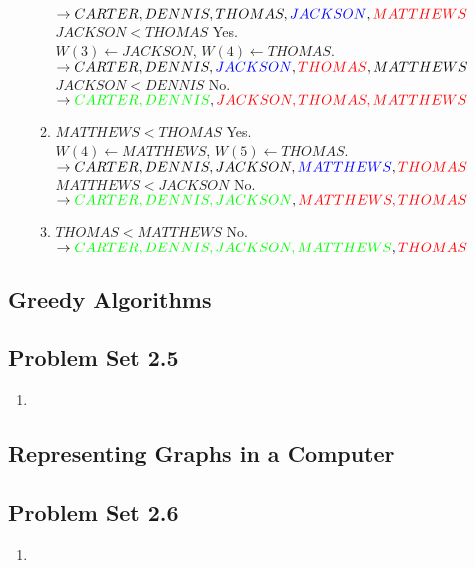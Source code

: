 \begin{enumerate}
\begin{enumerate}
			$\to CARTER,DENNIS,THOMAS,\textcolor{blue}{JACKSON},\textcolor{red}{MATTHEWS}$\\
			$JACKSON < THOMAS$ Yes.\\
			$W(3) \leftarrow JACKSON$, $W(4) \leftarrow THOMAS$.\\
			$\to CARTER,DENNIS,\textcolor{blue}{JACKSON},\textcolor{red}{THOMAS},MATTHEWS$\\
			$JACKSON < DENNIS$ No.\\
			$\to \textcolor{green}{CARTER, DENNIS}, \textcolor{red}{JACKSON, THOMAS, MATTHEWS}$
		\item $MATTHEWS < THOMAS$ Yes.\\
			$W(4) \leftarrow MATTHEWS$, $W(5) \leftarrow THOMAS$.\\
			$\to CARTER, DENNIS,JACKSON,\textcolor{blue}{MATTHEWS},\textcolor{red}{THOMAS}$\\
			$MATTHEWS < JACKSON$ No.\\
			$\to \textcolor{green}{CARTER, DENNIS, JACKSON}, \textcolor{red}{MATTHEWS, THOMAS}$
		\item $THOMAS < MATTHEWS$ No.\\
			$\to \textcolor{green}{CARTER, DENNIS, JACKSON, MATTHEWS}, \textcolor{red}{THOMAS}$
	\end{enumerate}
\end{enumerate}
\setcounter{subsection}{4}
\subsection{Greedy Algorithms}
\subsection*{Problem Set 2.5}
\begin{enumerate}
	\item
\end{enumerate}
\subsection{Representing Graphs in a Computer}
\subsection*{Problem Set 2.6}
\begin{enumerate}
	\item
\end{enumerate}

